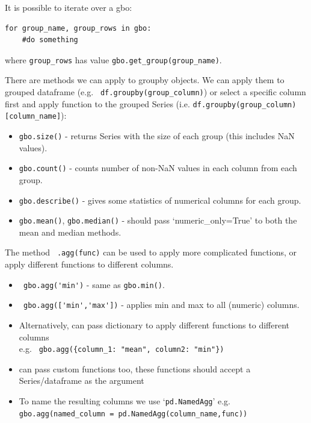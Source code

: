 \documentclass[8pt]{extarticle}
\begin{document}
\begin{multicols}{4}
\begin{tcolorbox}[width=\columnwidth, colback=white!95!black]
It is possible to iterate over a gbo:
\begin{lstlisting}[style=Python]
for group_name, group_rows in gbo:
    #do something
\end{lstlisting}
where \lstinline[style=Python]!group_rows! has value \lstinline[style=Python]!gbo.get_group(group_name)!.
\end{tcolorbox}

There are methods we can apply to groupby objects. We can apply them to grouped dataframe (e.g. \lstinline[style=Python]! df.groupby(group_column)!) or select a specific column first and apply function to the grouped Series (i.e. \lstinline[style=Python]!df.groupby(group_column)[column_name]!):

\begin{itemize}
    \item \lstinline[style=Python]!gbo.size()! - returns Series with the size of each group (this includes NaN values).
    \item \lstinline[style=Python]!gbo.count()! - counts number of non-NaN values in each column from each group.
    \item \lstinline[style=Python]!gbo.describe()! - gives some statistics of numerical columns for each group.
    \item \lstinline[style=Python]!gbo.mean()!, \lstinline[style=Python]!gbo.median()! - should pass `numeric\_only=True' to both the mean and median methods.
\end{itemize}

The method \lstinline[style=Python]! .agg(func)! can be used to apply more complicated functions, or apply different functions to different columns.

\begin{itemize}
    \item \lstinline[style=Python]! gbo.agg('min')! - same as \lstinline[style=Python]!gbo.min()!.
    \item \lstinline[style=Python]! gbo.agg(['min','max'])! - applies min and max to all (numeric) columns.
    \item Alternatively, can pass dictionary to apply different functions to different columns \\
    e.g. \lstinline[style=Python]! gbo.agg({column_1: "mean", column2: "min"})!
    \item can pass custom functions too, these functions should accept a Series/dataframe as the argument
    \item To name the resulting columns we use `\lstinline[style=Python]!pd.NamedAgg!' e.g.\\
    \lstinline[style=Python]!gbo.agg(named_column = pd.NamedAgg(column_name,func))!
\end{itemize}


\end{multicols}
\end{document}
